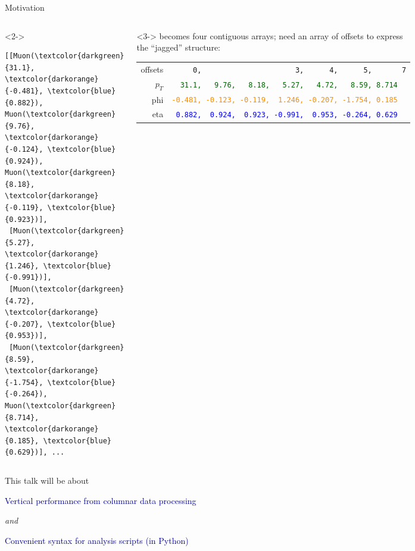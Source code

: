 \documentclass[aspectratio=169]{beamer}
\begin{document}
\begin{frame}[fragile]{Motivation}
\begin{columns}
\vspace{0.25 cm}
\begin{uncoverenv}<2->
\scriptsize
\begin{Verbatim}[commandchars=\\\{\}]
[[Muon(\textcolor{darkgreen}{31.1}, \textcolor{darkorange}{-0.481}, \textcolor{blue}{0.882}), Muon(\textcolor{darkgreen}{9.76}, \textcolor{darkorange}{-0.124}, \textcolor{blue}{0.924}), Muon(\textcolor{darkgreen}{8.18}, \textcolor{darkorange}{-0.119}, \textcolor{blue}{0.923})],
 [Muon(\textcolor{darkgreen}{5.27}, \textcolor{darkorange}{1.246}, \textcolor{blue}{-0.991})],
 [Muon(\textcolor{darkgreen}{4.72}, \textcolor{darkorange}{-0.207}, \textcolor{blue}{0.953})],
 [Muon(\textcolor{darkgreen}{8.59}, \textcolor{darkorange}{-1.754}, \textcolor{blue}{-0.264}), Muon(\textcolor{darkgreen}{8.714}, \textcolor{darkorange}{0.185}, \textcolor{blue}{0.629})], ...
\end{Verbatim}
\end{uncoverenv}

\vspace{0.25 cm}
\begin{uncoverenv}<3->
\scriptsize
{\normalsize becomes four contiguous arrays; need an array of offsets to express the ``jagged'' structure:}

\vspace{0.25 cm}
\begin{tabular}{r l}
\small offsets &                    {\tt\scriptsize \ \ \ \ \ 0,\ \ \ \ \ \ \ \ \ \ \ \ \ \ \ \ \ \ \ \ \ \ 3,\ \ \ \ \ \ 4,\ \ \ \ \ \ 5,\ \ \ \ \ \ \ 7} \\
\small $p_T$ & \textcolor{darkgreen}{\tt\scriptsize \ \ 31.1,\ \ \ 9.76,\ \ \ 8.18,\ \ \ 5.27,\ \ \ 4.72,\ \ \ 8.59, 8.714} \\
\small phi &  \textcolor{darkorange}{\tt\scriptsize -0.481,\ -0.123,\ -0.119,\ \ 1.246,\ -0.207,\ -1.754,\ 0.185} \\
\small eta &        \textcolor{blue}{\tt\scriptsize \ 0.882,\ \ 0.924,\ \ 0.923,\ -0.991,\ \ 0.953,\ -0.264,\ 0.629} \\
\end{tabular}
\end{uncoverenv}
\end{columns}
\end{frame}

\begin{frame}{This talk will be about}
\vspace{0.5 cm}
\Large
\begin{center}
\textcolor{darkblue}{Vertical performance from columnar data processing}

\vspace{0.5 cm}
{\it and}

\vspace{0.5 cm}
\textcolor{darkblue}{Convenient syntax for analysis scripts (in Python)}
\end{center}
\end{frame}
\end{document}

